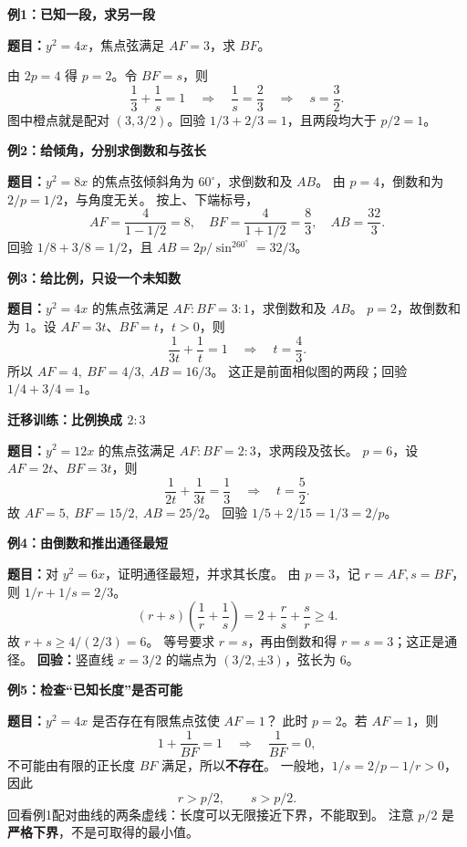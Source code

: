 \clearpage
\begin{examplebox}
\textbf{\textcolor{CExample}{例1：已知一段，求另一段}}

\textbf{题目：}$y^2=4x$，焦点弦满足 $AF=3$，求 $BF$。
\begin{center}\end{center}
由 $2p=4$ 得 $p=2$。令 $BF=s$，则
\[
 \frac13+\frac1s=1\quad\Longrightarrow\quad
 \frac1s=\frac23\quad\Longrightarrow\quad\boxed{s=\frac32}.
\]
图中橙点就是配对 $(3,3/2)$。回验 $1/3+2/3=1$，且两段均大于 $p/2=1$。
\end{examplebox}

\clearpage
\begin{examplebox}
\textbf{\textcolor{CExample}{例2：给倾角，分别求倒数和与弦长}}

\textbf{题目：}$y^2=8x$ 的焦点弦倾斜角为 $60^\circ$，求倒数和及 $AB$。
由 $p=4$，倒数和为 $\boxed{2/p=1/2}$，与角度无关。
按上、下端标号，
\[
 AF=\frac4{1-1/2}=8,\quad BF=\frac4{1+1/2}=\frac83,
 \quad\boxed{AB=\frac{32}3}.
\]
回验 $1/8+3/8=1/2$，且 $AB=2p/\sin^260^\circ=32/3$。

\par\medskip
\textbf{\textcolor{CExample}{例3：给比例，只设一个未知数}}

\textbf{题目：}$y^2=4x$ 的焦点弦满足 $AF:BF=3:1$，求倒数和及 $AB$。
$p=2$，故倒数和为 $1$。设 $AF=3t$、$BF=t$，$t>0$，则
\[
 \frac1{3t}+\frac1t=1\quad\Longrightarrow\quad t=\frac43.
\]
所以 $\boxed{AF=4,\ BF=4/3,\ AB=16/3}$。
这正是前面相似图的两段；回验 $1/4+3/4=1$。

\par\medskip
\textbf{\textcolor{CExample}{迁移训练：比例换成 $2:3$}}

\textbf{题目：}$y^2=12x$ 的焦点弦满足 $AF:BF=2:3$，求两段及弦长。
$p=6$，设 $AF=2t$、$BF=3t$，则
\[
 \frac1{2t}+\frac1{3t}=\frac13
 \quad\Longrightarrow\quad t=\frac52.
\]
故 $\boxed{AF=5,\ BF=15/2,\ AB=25/2}$。
回验 $1/5+2/15=1/3=2/p$。
\end{examplebox}

\clearpage
\begin{examplebox}
\textbf{\textcolor{CExample}{例4：由倒数和推出通径最短}}

\textbf{题目：}对 $y^2=6x$，证明通径最短，并求其长度。
由 $p=3$，记 $r=AF,s=BF$，则 $1/r+1/s=2/3$。
\[
 (r+s)\left(\frac1r+\frac1s\right)
 =2+\frac rs+\frac sr\ge4.
\]
故 $\boxed{r+s\ge4/(2/3)=6}$。
等号要求 $r=s$，再由倒数和得 $r=s=3$；这正是通径。
\textbf{回验：}竖直线 $x=3/2$ 的端点为 $(3/2,\pm3)$，弦长为 $6$。

\par\medskip
\textbf{\textcolor{CExample}{例5：检查“已知长度”是否可能}}

\textbf{题目：}$y^2=4x$ 是否存在有限焦点弦使 $AF=1$？
此时 $p=2$。若 $AF=1$，则
\[
 1+\frac1{BF}=1\quad\Longrightarrow\quad\frac1{BF}=0,
\]
不可能由有限的正长度 $BF$ 满足，所以\textbf{不存在}。
一般地，$1/s=2/p-1/r>0$，因此
\[
 \boxed{r>p/2},\qquad \boxed{s>p/2}.
\]
回看例1配对曲线的两条虚线：长度可以无限接近下界，不能取到。
注意 $p/2$ 是\textbf{严格下界}，不是可取得的最小值。
\end{examplebox}
